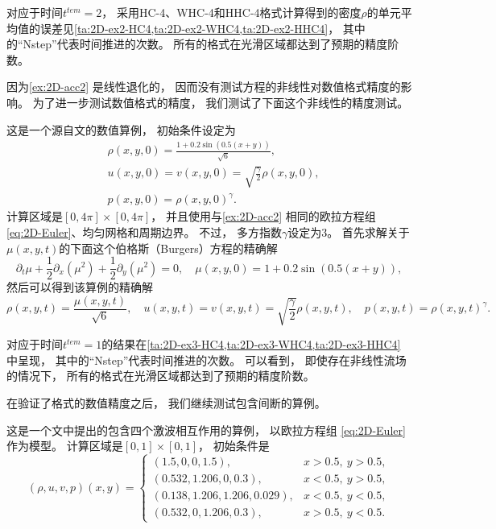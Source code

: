 对应于时间$t^{tem}=2$，
采用HC-4、WHC-4和HHC-4格式计算得到的密度$\rho$的单元平均值的误差见\cref{ta:2D-ex2-HC4,ta:2D-ex2-WHC4,ta:2D-ex2-HHC4}，
其中的“Nstep”代表时间推进的次数。
所有的格式在光滑区域都达到了预期的精度阶数。



因为\cref{ex:2D-acc2} 是线性退化的，
因而没有测试方程的非线性对数值格式精度的影响。
为了进一步测试数值格式的精度，
我们测试了下面这个非线性的精度测试。

\begin{example}[二维欧拉方程组的非线性的精度测试]
  \label{ex:2D-acc3}
  这是一个源自文\cite{Gamma3-HWENO}的数值算例，
  初始条件设定为
  \begin{align}
     & \rho(x, y, 0)=\frac{1+0.2\sin(0.5(x+y)) }{\sqrt{6}},        \\
     & u(x, y, 0)=v(x, y, 0)=\sqrt{\frac{\gamma}{2}}\rho(x, y, 0), \\
     & p(x, y, 0)=\rho(x, y, 0)^\gamma.
  \end{align}
  计算区域是$[0, 4\pi]\times[0, 4\pi]$，
  并且使用与\cref{ex:2D-acc2} 相同的欧拉方程组 \cref{eq:2D-Euler}、均匀网格和周期边界。
  不过，
  多方指数$\gamma$设定为3。
  首先求解关于$\mu(x, y, t)$的下面这个伯格斯（Burgers）方程的精确解
  \begin{equation}
    {\partial_{t}}\mu+\frac12{\partial_{x}}\left(\mu^2\right)+\frac12{\partial_{y}}\left(\mu^2\right)=0, \quad
    \mu(x, y, 0)=1+0.2\sin(0.5 (x+y)),
  \end{equation}
  然后可以得到该算例的精确解
  \begin{equation}
    \rho (x, y, t)=\frac{\mu(x, y, t)}{\sqrt{6}}, \quad
    u (x, y, t)=v (x, y, t)=\sqrt{\frac{\gamma}{2}} \rho (x, y, t), \quad
    p (x, y, t)=\rho (x, y, t)^\gamma.
  \end{equation}
\end{example}

对应于时间$t^{tem}=1$的结果在\cref{ta:2D-ex3-HC4,ta:2D-ex3-WHC4,ta:2D-ex3-HHC4} 中呈现，
其中的“Nstep”代表时间推进的次数。
可以看到，
即使存在非线性流场的情况下，
所有的格式在光滑区域都达到了预期的精度阶数。



在验证了格式的数值精度之后，
我们继续测试包含间断的算例。
\begin{example}[二维欧拉方程组的黎曼问题1]
  \label{ex:RP1}
  这是一个文\cite{RPexample}中提出的包含四个激波相互作用的算例，
  以欧拉方程组 \cref{eq:2D-Euler} 作为模型。
  计算区域是$[0,1]\times[0,1]$，
  初始条件是
  \begin{equation}
    (\rho, u, v, p) (x, y)=
    \begin{cases}
      (1.5, 0, 0, 1.5),             & x>0.5,~y>0.5,  \\
      (0.532, 1.206, 0, 0.3),       & x<0.5,~y>0.5,  \\
      (0.138, 1.206, 1.206, 0.029), & x<0.5,~y<0.5,  \\
      (0.532, 0, 1.206, 0.3),       & x>0.5,~y<0.5.
    \end{cases}
  \end{equation}
\end{example}

